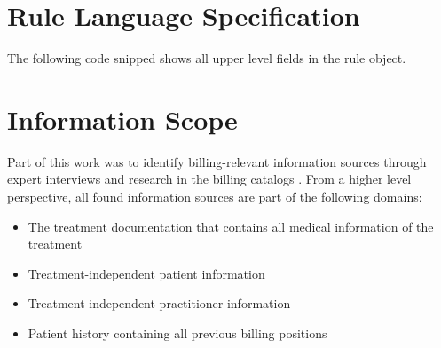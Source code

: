\section{Rule Language Specification}\label{sec:rule-language-specification}

The following code snipped \addref shows all upper level fields in the rule object.



\section{Information Scope}\label{sec:information-scope}
Part of this work was
to identify billing-relevant information sources through expert interviews and research in the billing catalogs \addcite.
From a higher level perspective, all found information sources are part of the following domains:
\begin{itemize}
    \item The treatment documentation that contains all medical information of the treatment
    \item Treatment-independent patient information
    \item Treatment-independent practitioner information
    \item Patient history containing all previous billing positions
\end{itemize}






